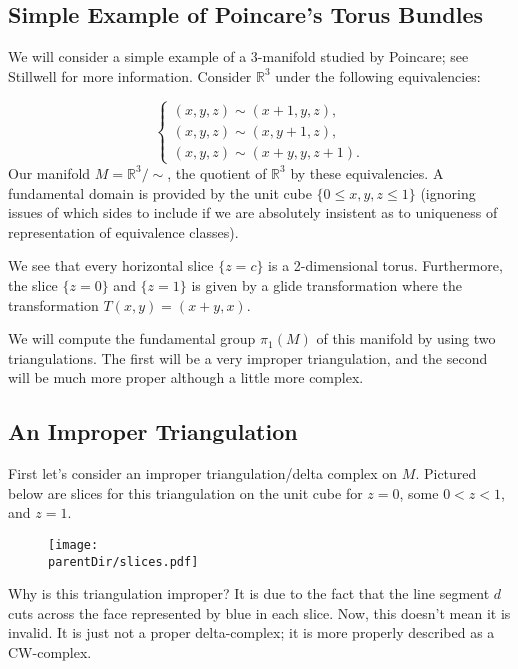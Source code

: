 \def\parentDir{Topology/SimplePoincareTorusBundle}

\subsection{Simple Example of Poincare's Torus Bundles}

We will consider a simple example of a 3-manifold studied by Poincare; see Stillwell 
\cite{stillwell3Mnflds} for more information. Consider \(\mathbb R^3\) under the following equivalencies:

\begin{equation}
\begin{cases}
(x, y, z) \sim (x + 1, y, z), \\
(x, y, z) \sim (x, y + 1, z), \\
(x, y, z) \sim (x + y, y, z + 1).
\end{cases}
\end{equation}
Our manifold \(M = \mathbb R^3 / \sim\), the quotient of \(\mathbb R^3\) by these equivalencies. A fundamental domain is 
provided by the unit cube \(\{0 \leq x, y,z \leq 1\}\) (ignoring issues of which sides to include if we are absolutely insistent
as to uniqueness of representation of equivalence classes).  

We see that every horizontal slice \(\{z = c\}\) is a 2-dimensional torus. Furthermore, the slice \(\{z = 0\}\) and \(\{z = 1\}\)
is given by a glide transformation where the transformation \(T(x, y) = (x + y, x)\).

We will compute the fundamental group \(\pi_1(M)\) of this manifold by using two triangulations. The first will be a very improper
triangulation, and the second will be much more proper although a little more complex.

\subsection*{An Improper Triangulation}

First let's consider an improper triangulation/delta complex on \(M\). Pictured below are slices for this triangulation on the unit cube for
\(z = 0\), some \(0 < z < 1\), and \(z = 1\).

\begin{figure}[H]
\centering
\texttt{[image: \\parentDir/slices.pdf]}
\end{figure}

Why is this triangulation improper? It is due to the fact that the line segment \(d\) cuts across the face represented by blue in each slice.
Now, this doesn't mean it is invalid. It is just not a proper delta-complex; it is more properly described as a CW-complex.

